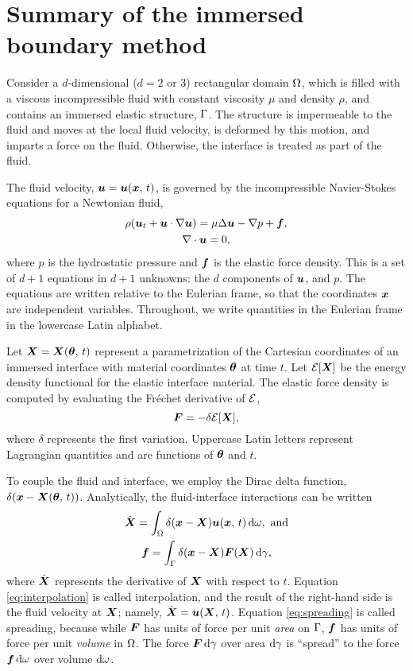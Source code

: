 \section{Summary of the immersed boundary method}

Consider a $d$-dimensional ($d=2$ or 3) rectangular domain $\Omega$, which is
filled with a viscous incompressible fluid with constant viscosity $\mu$ and
density $\rho$, and contains an immersed elastic structure, $\Gamma$. The
structure is impermeable to the fluid and moves at the local fluid velocity, is
deformed by this motion, and imparts a force on the fluid. Otherwise, the
interface is treated as part of the fluid. 

The fluid velocity, $\boldsymbol{u} = \boldsymbol{u}(\boldsymbol{x},\,t)$, is governed by the
incompressible Navier-Stokes equations for a Newtonian fluid,
\begin{gather}
    \label{eq:ins-momentum}
    \rho(\u_t + \u\cdot\grad\u) = \mu\Delta\u - \grad p + \f, \\
    \label{eq:ins-incompressibility}
    \div\u = 0,
\end{gather}
where $p$ is the hydrostatic pressure and $\boldsymbol{f}$ is the elastic force
density. This is a set of $d+1$ equations in $d+1$ unknowns: the $d$ components
of $\boldsymbol{u}$, and $p$. The equations are written relative to the Eulerian
frame, so that the coordinates $\boldsymbol{x}$ are independent variables. Throughout,
we write quantities in the Eulerian frame in the lowercase Latin alphabet.

Let $\boldsymbol{X}=\boldsymbol{X}(\boldsymbol{\theta},\,t)$ represent a parametrization of the
Cartesian coordinates of an immersed interface with material coordinates
$\boldsymbol{\theta}$ at time $t$. Let $\mathcal{E}[\boldsymbol{X}]$ be the energy density
functional for the elastic interface material. The elastic force density is
computed by evaluating the Fréchet derivative of $\mathcal{E}$,
\begin{equation}
    \label{eq:forces}
    \boldsymbol{F} = -\delta \mathcal{E}[\boldsymbol{X}],
\end{equation}
where $\delta$ represents the first variation. Uppercase Latin letters
represent Lagrangian quantities and are functions of $\boldsymbol{\theta}$ and $t$.

To couple the fluid and interface, we employ the Dirac delta function,
$\delta(\boldsymbol{x}-\boldsymbol{X}(\boldsymbol{\theta},\,t))$. Analytically, the fluid-interface
interactions can be written
\begin{gather}
    \label{eq:interpolation}
    \U = \int_\domain \Dirac(\x-\X) \u(\x,\,t)\d\omega,\ \text{and} \\
    \label{eq:spreading}
    \f = \int_\interface \Dirac(\x-\X)\F(\X)\d\gamma,
\end{gather}
where $\dot{\boldsymbol{X}}$ represents the derivative of $\boldsymbol{X}$ with respect to $t$. Equation
\eqref{eq:interpolation} is called interpolation, and the result of the
right-hand side is the fluid velocity at $\boldsymbol{X}$; namely, $\dot{\boldsymbol{X}} = \boldsymbol{u}(\boldsymbol{X},\,t)$.
Equation \eqref{eq:spreading} is called spreading, because while $\boldsymbol{F}$ has units
of force per unit \emph{area} on $\Gamma$, $\boldsymbol{f}$ has units of force per unit
\emph{volume} in $\Omega$. The force $\F\d\gamma$ over area $\d\gamma$ is
``spread'' to the force $\f\d\omega$ over volume $\d\omega$. 

